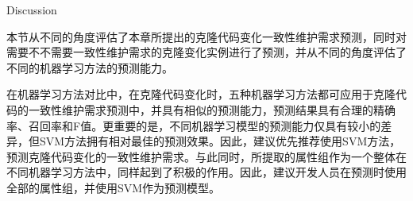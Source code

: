
{Discussion}

本节从不同的角度评估了本章所提出的克隆代码变化一致性维护需求预测，同时对需要不不需要一致性维护需求的克隆变化实例进行了预测，并从不同的角度评估了不同的机器学习方法的预测能力。

在机器学习方法对比中，在克隆代码变化时，五种机器学习方法都可应用于克隆代码的一致性维护需求预测中，并具有相似的预测能力，预测结果具有合理的精确率、召回率和F值。更重要的是，不同机器学习模型的预测能力仅具有较小的差异，但SVM方法拥有相对最佳的预测效果。因此，建议优先推荐使用SVM方法，预测克隆代码变化的一致性维护需求。与此同时，所提取的属性组作为一个整体在不同机器学习方法中，同样起到了积极的作用。因此，建议开发人员在预测时使用全部的属性组，并使用SVM作为预测模型。

